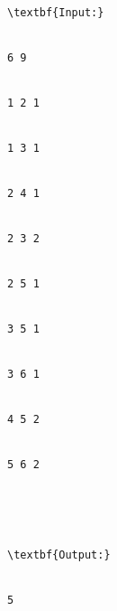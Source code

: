 \begin{verbatim}
\textbf{Input:}


6 9


1 2 1


1 3 1


2 4 1


2 3 2


2 5 1


3 5 1


3 6 1


4 5 2


5 6 2





\textbf{Output:}


5


\end{verbatim}